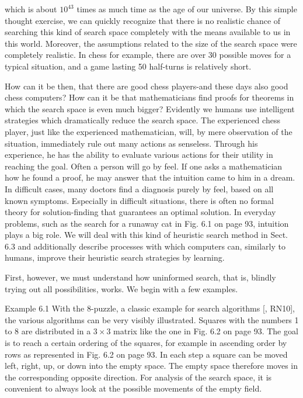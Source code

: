 \documentclass[10pt]{book}
\begin{document}
which is about $10^{43}$ times as much time as the age of our universe. By this simple thought exercise, we can quickly recognize that there is no realistic chance of searching this kind of search space completely with the means available to us in this world. Moreover, the assumptions related to the size of the search space were completely realistic. In chess for example, there are over 30 possible moves for a typical situation, and a game lasting 50 half-turns is relatively short.

How can it be then, that there are good chess players-and these days also good chess computers? How can it be that mathematicians find proofs for theorems in which the search space is even much bigger? Evidently we humans use intelligent strategies which dramatically reduce the search space. The experienced chess player, just like the experienced mathematician, will, by mere observation of the situation, immediately rule out many actions as senseless. Through his experience, he has the ability to evaluate various actions for their utility in reaching the goal. Often a person will go by feel. If one asks a mathematician how he found a proof, he may answer that the intuition came to him in a dream. In difficult cases, many doctors find a diagnosis purely by feel, based on all known symptoms. Especially in difficult situations, there is often no formal theory for solution-finding that guarantees an optimal solution. In everyday problems, such as the search for a runaway cat in Fig. 6.1 on page 93, intuition plays a big role. We will deal with this kind of heuristic search method in Sect. 6.3 and additionally describe processes with which computers can, similarly to humans, improve their heuristic search strategies by learning.

First, however, we must understand how uninformed search, that is, blindly trying out all possibilities, works. We begin with a few examples.

Example 6.1 With the 8-puzzle, a classic example for search algorithms [\cite{nilsson1998synthesis}, RN10], the various algorithms can be very visibly illustrated. Squares with the numbers 1 to 8 are distributed in a $3 \times 3$ matrix like the one in Fig. 6.2 on page 93. The goal is to reach a certain ordering of the squares, for example in ascending order by rows as represented in Fig. 6.2 on page 93. In each step a square can be moved left, right, up, or down into the empty space. The empty space therefore moves in the corresponding opposite direction. For analysis of the search space, it is convenient to always look at the possible movements of the empty field.
\end{document}
